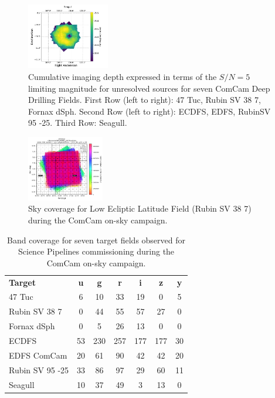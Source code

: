 \begin{figure}
\begin{center}
        \includegraphics[width=0.32\textwidth]{observations_figures/comcam_psf_maglim_seagull_r.pdf}
    \end{center}
    \caption{Cumulative imaging depth expressed in terms of the $S/N=5$ limiting magnitude for unresolved sources for seven ComCam Deep Drilling Fields.
    First Row (left to right): 47 Tuc, Rubin SV 38 7, Fornax dSph.
    Second Row (left to right): ECDFS, EDFS, RubinSV 95 -25.
    Third Row: Seagull.}
    \label{fig:comcam_ddf_psf_maglim}
\end{figure}

\begin{figure}
    \begin{center}
      \includegraphics[width=0.3\textwidth]{observations_figures/showVisit_DM-30993_LSSTComCam_10463.png}
    \end{center}
    \caption{Sky coverage for Low Ecliptic Latitude Field (Rubin SV 38 7) during the ComCam on-sky campaign.}
    \label{fig:comcam_ecliptic_coverage}
\end{figure}

\begin{table}
    \centering
    \begin{tabular}{@{}lcccccc@{}}
    \textbf{Target} & \textbf{u} & \textbf{g} & \textbf{r} & \textbf{i} & \textbf{z} & \textbf{y} \\
    47 Tuc          &	     6 & 	10 &	33 &	19 &	 0 &     5 \\
    Rubin SV 38 7 	&       0 &    44 & 	55 &	57 &    27 &     0 \\
    Fornax dSph 	&       0 &	 5 &	26 &	13 &	 0 &	 0 \\
    ECDFS 	        &      53 &   230 &   257 &   177 &   177 &	30 \\
    EDFS ComCam 	&      20 &	61 & 	90 &	42 &	42 &	20 \\
    Rubin SV 95 -25 & 	    33 &	86 &	97 &	29 &	60 &	11 \\
    Seagull 	    &      10 &	37 &   	49 &	3  & 	13 & 	 0 \\
    \end{tabular}
    \caption{Band coverage for seven target fields observed for Science Pipelines commissioning during the ComCam on-sky campaign.}
    \label{tab:target_fields_band_coverage}
\end{table}

